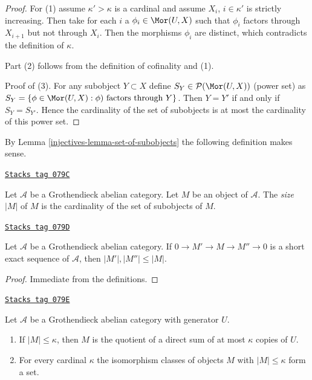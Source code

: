 \begin{proof}
For (1) assume $\kappa' > \kappa$ is a cardinal and assume
$X_i$, $i \in \kappa'$ is strictly increasing. Then take for
each $i$ a $\phi_i \in \Mor(U, X)$ such that $\phi_i$ factors through
$X_{i + 1}$ but not through $X_i$. Then the morphisms $\phi_i$
are distinct, which contradicts the definition of $\kappa$.

\medskip\noindent
Part (2) follows from the definition of cofinality and (1).

\medskip\noindent
Proof of (3). For any subobject $Y \subset X$
define $S_Y \in \mathcal{P}(\Mor(U, X))$ (power set) as
$S_Y = \{\phi \in \Mor(U,X) : \phi)\text{ factors through }Y\}$.
Then $Y = Y'$ if and only if $S_Y = S_{Y'}$. Hence the cardinality
of the set of subobjects is at most the cardinality of this power set.
\end{proof}

By Lemma \ref{injectives-lemma-set-of-subobjects} the following definition makes sense.

\begin{definition}[Size]
\label{injectives-definition-size}
\href{https://stacks.math.columbia.edu/tag/079C}{\texttt{Stacks tag 079C}}

Let $\mathcal{A}$ be a Grothendieck abelian category.
Let $M$ be an object of $\mathcal{A}$.
The {\it size} $|M|$ of $M$ is the cardinality of the set of subobjects
of $M$.
\end{definition}

\begin{lemma}
\label{injectives-lemma-size-goes-down}
\href{https://stacks.math.columbia.edu/tag/079D}{\texttt{Stacks tag 079D}}

Let $\mathcal{A}$ be a Grothendieck abelian category.
If $0 \to M' \to M \to M'' \to 0$ is a short exact sequence of
$\mathcal{A}$, then $|M'|, |M''| \leq |M|$.
\end{lemma}

\begin{proof}
Immediate from the definitions.
\end{proof}

\begin{lemma}
\label{injectives-lemma-set-iso-classes-bounded-size}
\href{https://stacks.math.columbia.edu/tag/079E}{\texttt{Stacks tag 079E}}

Let $\mathcal{A}$ be a Grothendieck abelian category with generator $U$.
\begin{enumerate}
\item If $|M| \leq \kappa$, then $M$ is the quotient of a direct
sum of at most $\kappa$ copies of $U$.
\item For every cardinal $\kappa$ the isomorphism classes
of objects $M$ with $|M| \leq \kappa$ form a set.
\end{enumerate}
\end{lemma}

